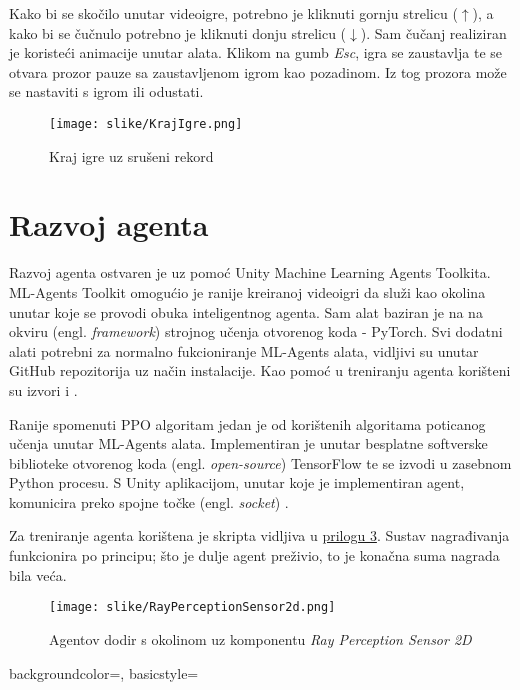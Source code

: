 \documentclass[]{foi} %
\begin{document}
Kako bi se skočilo unutar videoigre, potrebno je kliknuti gornju strelicu ($\uparrow$), a kako bi se čučnulo potrebno je kliknuti donju strelicu ($\downarrow$). Sam čučanj realiziran je koristeći animacije unutar alata. Klikom na gumb \textit{Esc}, igra se zaustavlja te se otvara prozor pauze sa zaustavljenom igrom kao pozadinom. Iz tog prozora može se nastaviti s igrom ili odustati.

\begin{figure}[H]
    \centering
    \texttt{[image: slike/KrajIgre.png]}
    \caption{Kraj igre uz srušeni rekord}
\end{figure}

\section{Razvoj agenta}
Razvoj agenta ostvaren je uz pomoć Unity Machine Learning Agents Toolkita. ML-Agents Toolkit omogućio je ranije kreiranoj videoigri da služi kao okolina unutar koje se provodi obuka inteligentnog agenta. Sam alat baziran je na na okviru (engl. \textit{framework}) strojnog učenja otvorenog koda - PyTorch. Svi dodatni alati potrebni za normalno fukcioniranje ML-Agents alata, vidljivi su unutar GitHub repozitorija \cite{githubPocetna} uz način instalacije. Kao pomoć u treniranju agenta korišteni su izvori \cite{youtubeAI} i \cite{youtubeFlappy}.

Ranije spomenuti PPO algoritam jedan je od korištenih algoritama poticanog učenja unutar ML-Agents alata. Implementiran je unutar besplatne softverske biblioteke otvorenog koda (engl. \textit{open-source}) TensorFlow te se izvodi u zasebnom Python procesu. S Unity aplikacijom, unutar koje je implementiran agent, komunicira preko spojne točke (engl. \textit{socket}) \cite{githubPPO}.

Za treniranje agenta korištena je skripta vidljiva u \hyperref[cha: prilog 3]{prilogu 3}. Sustav nagrađivanja funkcionira po principu; što je dulje agent preživio, to je konačna suma nagrada bila veća. 

\begin{figure}[H]
    \centering
    \texttt{[image: slike/RayPerceptionSensor2d.png]}
    \caption{Agentov dodir s okolinom uz komponentu \textit{Ray Perception Sensor 2D}}
\end{figure}

{
    backgroundcolor=\color{black},
    basicstyle=\scriptsize\color{white}\ttfamily
}
\end{document}
